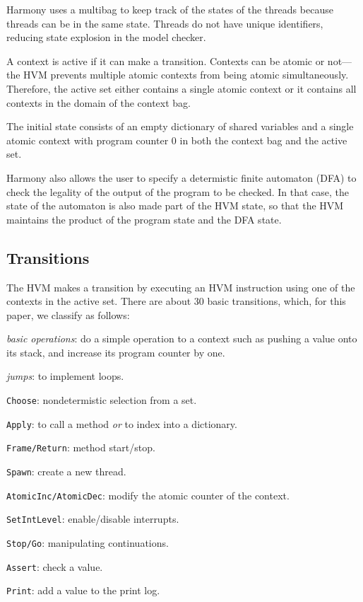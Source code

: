 \documentclass[twocolumn]{article}
\begin{document}
Harmony uses a multibag to keep track of the states of the threads
because threads can be in the same state.
Threads do not have unique identifiers, reducing state explosion in
the model checker.

A context is active if it can make a transition.
Contexts can be atomic or not---the HVM prevents multiple atomic
contexts from being atomic simultaneously.  Therefore, the active set
either contains a single atomic context or it contains all contexts
in the domain of the context bag.

The initial state consists of an empty dictionary of shared variables and
a single atomic context with program
counter 0 in both the context bag and the active set.

Harmony also allows the user to specify a determistic finite automaton
(DFA) to check the legality of the output of the program to be
checked.  In that case, the state of the automaton is also made
part of the HVM state, so that the HVM maintains the product of the
program state and the DFA state.

\subsection{Transitions}

The HVM makes a transition by executing an HVM instruction using
one of the contexts in the active set.  There are about 30 basic
transitions, which, for this paper, we classify as follows:

\begin{compactitem}
\item \emph{basic operations}: do a simple operation to a context
such as pushing a value onto its stack, and increase its program
counter by one.
\item \emph{jumps}: to implement loops.
\item \texttt{Choose}: nondetermistic selection from a set.
\item \texttt{Apply}: to call a method \emph{or} to index into a dictionary.
\item \texttt{Frame/Return}: method start/stop.
\item \texttt{Spawn}: create a new thread.
\item \texttt{AtomicInc/AtomicDec}: modify the atomic counter of the context.
\item \texttt{SetIntLevel}: enable/disable interrupts.
\item \texttt{Stop/Go}: manipulating continuations.
\item \texttt{Assert}: check a value.
\item \texttt{Print}: add a value to the print log.
\end{compactitem}
\end{document}
